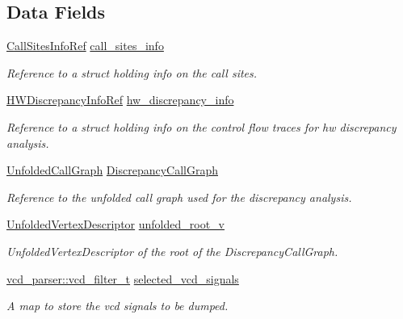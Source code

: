 \subsection*{Data Fields}
\begin{DoxyCompactItemize}
\item 
\hyperlink{Discrepancy_8hpp_aa1d62da21f69dae54811e632cadaf6b2}{Call\+Sites\+Info\+Ref} \hyperlink{structDiscrepancy_ab6c0caf5016e197a993fecb5712c8d10}{call\+\_\+sites\+\_\+info}
\begin{DoxyCompactList}\small\item\em Reference to a struct holding info on the call sites. \end{DoxyCompactList}\item 
\hyperlink{Discrepancy_8hpp_a17b9b60c3df0b3aa36e80b29c6b1168c}{H\+W\+Discrepancy\+Info\+Ref} \hyperlink{structDiscrepancy_a996c85a4aeed53e65901fdaec07630ae}{hw\+\_\+discrepancy\+\_\+info}
\begin{DoxyCompactList}\small\item\em Reference to a struct holding info on the control flow traces for hw discrepancy analysis. \end{DoxyCompactList}\item 
\hyperlink{classUnfoldedCallGraph}{Unfolded\+Call\+Graph} \hyperlink{structDiscrepancy_a95678490e9b1083fc917b21c9adaaca2}{Discrepancy\+Call\+Graph}
\begin{DoxyCompactList}\small\item\em Reference to the unfolded call graph used for the discrepancy analysis. \end{DoxyCompactList}\item 
\hyperlink{UnfoldedCallGraph_8hpp_a6c87395c9d950d587c8e4db39b93e3e2}{Unfolded\+Vertex\+Descriptor} \hyperlink{structDiscrepancy_a72a1643010c0f91d5925ca916cc1782e}{unfolded\+\_\+root\+\_\+v}
\begin{DoxyCompactList}\small\item\em Unfolded\+Vertex\+Descriptor of the root of the Discrepancy\+Call\+Graph. \end{DoxyCompactList}\item 
\hyperlink{classvcd__parser_a00f10dd896fdc534014c6192eed18d55}{vcd\+\_\+parser\+::vcd\+\_\+filter\+\_\+t} \hyperlink{structDiscrepancy_af3c55dd244654a9c89dc7e41f8909664}{selected\+\_\+vcd\+\_\+signals}
\begin{DoxyCompactList}\small\item\em A map to store the vcd signals to be dumped. \end{DoxyCompactList}\item 

\end{DoxyCompactItemize}
